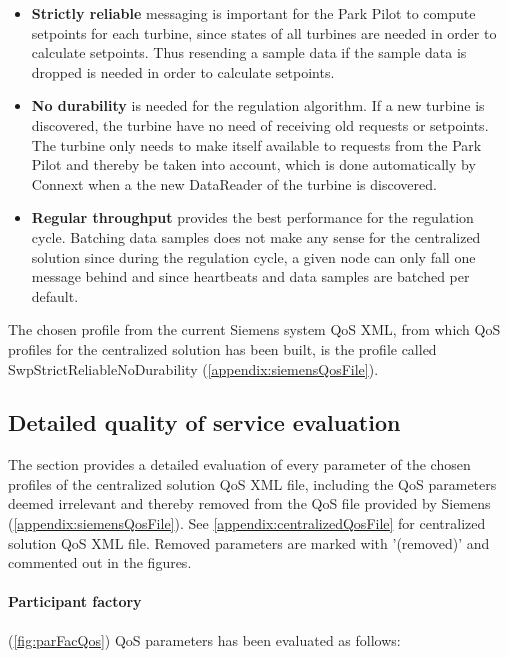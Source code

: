 \begin{itemize}
	\item \textbf{Strictly reliable} messaging is important for the Park Pilot to compute setpoints for each turbine, since states of all turbines are needed in order to calculate setpoints. Thus resending a sample data if the sample data is dropped is needed in order to calculate setpoints. 
	\item \textbf{No durability} is needed for the regulation algorithm. If a new turbine is discovered, the turbine have no need of receiving old requests or setpoints. The turbine only needs to make itself available to requests from the Park Pilot and thereby be taken into account, which is done automatically by Connext when a the new DataReader of the turbine is discovered.  
	\item \textbf{Regular throughput} provides the best performance for the regulation cycle. Batching data samples does not make any sense for the centralized solution since during the regulation cycle, a given node can only fall one message behind and since heartbeats and data samples are batched per default.
\end{itemize}

The chosen profile from the current Siemens system QoS XML, from which QoS profiles for the centralized solution has been built, is the profile called SwpStrictReliableNoDurability (\cref{appendix:siemensQosFile}).


\subsection{Detailed quality of service evaluation} \label{sec:detailedQoSDesc}

The section provides a detailed evaluation of every parameter of the chosen profiles of the centralized solution QoS XML file, including the QoS parameters deemed irrelevant and thereby removed from the QoS file provided by Siemens (\cref{appendix:siemensQosFile}). See \cref{appendix:centralizedQosFile} for centralized solution QoS XML file. Removed parameters are marked with '(removed)' and commented out in the figures.

\paragraph{Participant factory} (\cref{fig:parFacQos}) QoS parameters has been evaluated as follows:

